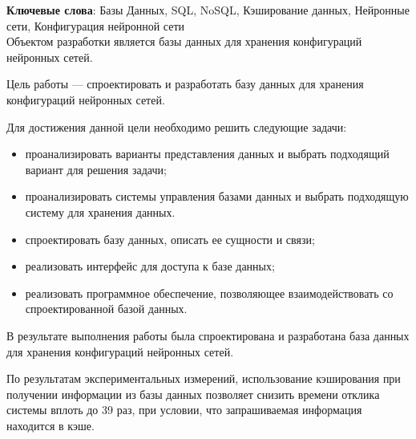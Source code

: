 \begin{essay}{}
    \noindent\textbf{Ключевые слова}: Базы Данных, SQL, NoSQL, Кэширование данных, Нейронные сети, Конфигурация нейронной сети\\
        
    Объектом разработки является базы данных для хранения конфигураций нейронных сетей.
    
    Цель работы --- спроектировать и разработать базу данных для хранения конфигураций нейронных сетей.
    
    Для достижения данной цели необходимо решить следующие задачи:
    
    \begin{itemize}
        \item проанализировать варианты представления данных и выбрать подходящий вариант для решения задачи;
        \item проанализировать системы управления базами данных и выбрать подходящую систему для хранения данных.
        \item спроектировать базу данных, описать ее сущности и связи;
        \item реализовать интерфейс для доступа к базе данных;
        \item реализовать программное обеспечение, позволяющее взаимодействовать со спроектированной базой данных.
    \end{itemize}
    
    В результате выполнения работы была спроектирована и разработана база данных для хранения конфигураций нейронных сетей.
    
    По результатам экспериментальных измерений, использование кэширования при получении информации из базы данных позволяет снизить времени отклика системы вплоть до 39 раз, при условии, что запрашиваемая информация находится в кэше.
\end{essay}